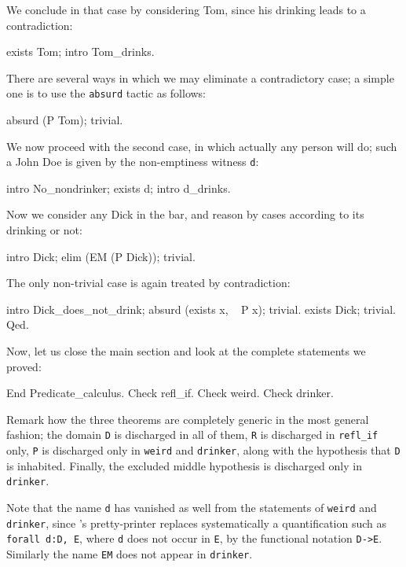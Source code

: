 \documentclass[11pt,a4paper]{book}
\begin{document}
We conclude in that case by considering Tom, since his drinking leads to
a contradiction:
\begin{coq_example}
exists Tom; intro Tom_drinks.
\end{coq_example}

There are several ways in which we may eliminate a contradictory case;
a simple one is to use the \verb:absurd: tactic as follows:
\begin{coq_example}
absurd (P Tom); trivial.
\end{coq_example}

We now proceed with the second case, in which actually any person will do;
such a John Doe is given by the non-emptiness witness \verb:d::
\begin{coq_example}
intro No_nondrinker; exists d; intro d_drinks.
\end{coq_example}

Now we consider any Dick in the bar, and reason by cases according to its
drinking or not:
\begin{coq_example}
intro Dick; elim (EM (P Dick)); trivial.
\end{coq_example}

The only non-trivial case is again treated by contradiction:
\begin{coq_example}
intro Dick_does_not_drink; absurd (exists x, ~ P x); trivial.
exists Dick; trivial.
Qed.
\end{coq_example}

Now, let us close the main section and look at the complete statements
we proved:
\begin{coq_example}
End Predicate_calculus.
Check refl_if.
Check weird.
Check drinker.
\end{coq_example}

Remark how the three theorems are completely generic in the most general 
fashion;
the domain \verb:D: is discharged in all of them, \verb:R: is discharged in
\verb:refl_if: only, \verb:P: is discharged only in \verb:weird: and
\verb:drinker:, along with the hypothesis that \verb:D: is inhabited. 
Finally, the excluded middle hypothesis is discharged only in 
\verb:drinker:.

Note that the name \verb:d: has vanished as well from
the statements of \verb:weird: and \verb:drinker:, 
since \Coq's pretty-printer replaces
systematically a quantification such as \verb+forall d:D, E+, where \verb:d:
does not occur in \verb:E:, by the functional notation \verb:D->E:. 
Similarly the name \verb:EM: does not appear in \verb:drinker:. 
\end{document}
